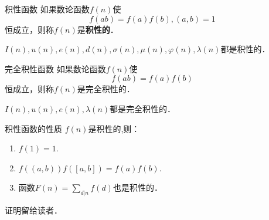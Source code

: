 

\begin{issues}
\issueAbstract
\end{issues}

\begin{definition}{积性函数}
如果数论函数$f(n)$使
\begin{equation}
f(ab)=f(a)f(b),(a,b)=1
\end{equation}
恒成立，则称$f(n)$是\textbf{积性的}．
\end{definition}

\begin{example}{}
$I(n),u(n),e(n),d(n),\sigma(n),\mu(n),\varphi(n),\lambda(n)$都是积性的．
\end{example}

\begin{definition}{完全积性函数}
如果数论函数$f(n)$使
\begin{equation}
f(ab)=f(a)f(b)
\end{equation}
恒成立，则称$f(n)$是完全积性的．
\end{definition}

\begin{example}{}
$I(n),u(n),e(n),\lambda(n)$都是完全积性的．
\end{example}

\begin{theorem}{积性函数的性质}
$f(n)$是积性的,则：
\begin{enumerate}
\item $f(1)=1$.
\item $f((a,b))f([a,b])=f(a)f(b)$.
\item 函数$F(n)=\sum\limits_{d|n}f(d)$也是积性的．
\end{enumerate}
\end{theorem}

证明留给读者．